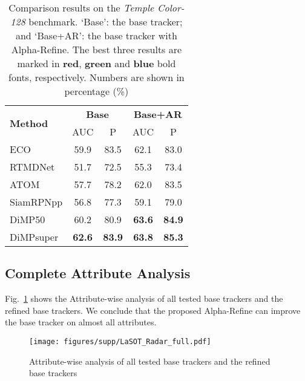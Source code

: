 \documentclass[final]{cvpr}
\begin{document}
{\begin{appendices}
\begin{table}[htbp]
\caption{Comparison results on the \textit{Temple Color-128} benchmark. 
    `Base': the base tracker; and `Base+AR': the base tracker with Alpha-Refine. 
    The best three results are marked in \textbf{\textcolor[rgb]{1,0,0}{red}}, \textbf{\textcolor[rgb]{0,1,0}{green}} and \textbf{\textcolor[rgb]{0,0,1}{blue}} bold fonts, respectively.   Numbers are shown in percentage (\%)  \label{TColor128}}
\begin{center}
\begin{tabular}{l|c|c|c|c}
\hline
\multirow{2}{*}{\textbf{Method}}  &\multicolumn{2}{c|}{\textbf{Base}}   &\multicolumn{2}{c}{\textbf{Base+AR}} \\
\cline{2-5}
    	     &AUC   &P 	    &AUC   &P 	 \\
\hline
ECO         &59.9 &83.5 &62.1 &83.0 \\
RTMDNet     &51.7 &72.5 &55.3 &73.4 \\
ATOM        &57.7 &78.2 &62.0 &83.5 \\
SiamRPNpp   &56.8 &77.3 &59.1 &79.0 \\
DiMP50      &60.2 &80.9 &\textbf{\textcolor[rgb]{0,1,0}{63.6}} &\textbf{\textcolor[rgb]{0,1,0}{84.9}} \\
DiMPsuper   &\textbf{\textcolor[rgb]{0,0,1}{62.6}} &\textbf{\textcolor[rgb]{0,0,1}{83.9}} &\textbf{\textcolor[rgb]{1,0,0}{63.8}} &\textbf{\textcolor[rgb]{1,0,0}{85.3}} \\

\hline
\end{tabular}
\end{center}
\vspace{-6mm}
\end{table}



\subsection{Complete Attribute Analysis}
 
Fig.~\ref{fig:att_full} shows the Attribute-wise analysis of all tested base trackers and the refined base trackers. We conclude that the proposed Alpha-Refine can improve the base tracker on almost all attributes.

\begin{figure}[!h]
\centering
\texttt{[image: figures/supp/LaSOT\_Radar\_full.pdf]}
\caption{Attribute-wise analysis of all tested base trackers and the refined base trackers} \label{fig:att_full}
\end{figure} 

\end{appendices}
}
\end{document}
